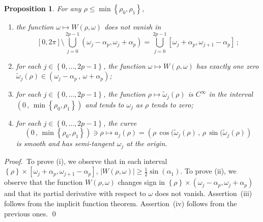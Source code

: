 \documentclass[12pt,a4paper]{amsart}
\theoremstyle{plain} %
\newtheorem{proposition}[theorem]{Proposition}
\theoremstyle{definition}
\numberwithin{equation}{section}
\numberwithin{figure}{section}
\numberwithin{table}{section}
\newcommand{\pf}{\emph{Proof.~}}
\newcommand{\sm}{\!\setminus\!}
\newcommand{\set}[1]{\left\lbrace #1 \right\rbrace}
\newcommand{\omegat}{\widetilde{\omega}}
\begin{document}
\begin{proposition}\label{P-lsc-2}
For any $\rho \le \min\set{\rho_0,\rho_1}$,
\begin{enumerate}
  \item[(i)] the function $\omega \mapsto W(\rho,\omega)$ does not vanish in $$
      [0,2\pi] \sm \bigcup_{j=0}^{2p-1}\left( \omega_j-\alpha_p,\omega_j+\alpha_p\right) = \bigcup_{j=0}^{2p-1}\left[ \omega_j+\alpha_p,\omega_{j+1}-\alpha_p\right]\,;
$$
  \item[(ii)]for each $j \in \set{0,\ldots,2p-1}$, the function $\omega \mapsto W(\rho,\omega)$ has exactly one zero
  $\omegat_j(\rho) \in \left( \omega_j - \alpha_p \,,\, \omega+\alpha_p \right)$;
  \item[(iii)] for each $j \in \set{0,\ldots,2p-1}$, the function $\rho \mapsto \omegat_j(\rho)$ is $C^{\infty}$ in the interval $\left( 0 \,,\, \min\set{\rho_0,\rho_1}\right)$ and tends to $\omega_j$ as $\rho$ tends to zero;
  \item[(iv)] for each $j \in \set{0,\ldots,2p-1}$, the curve
  $$
  \left( 0 \,,\, \min\set{\rho_0,\rho_1}\right) \ni \rho \mapsto a_j(\rho) = \left( \rho \, \cos(\omegat_j(\rho) \,,\, \rho \, \sin(\omegat_j(\rho)  \right)
  $$
  is smooth and has semi-tangent $\omega_j$ at the origin.
\end{enumerate}
\end{proposition}%

\pf To prove (i), we observe that in each interval $\set{\rho} \times \left[ \omega_j+\alpha_p,\omega_{j+1}-\alpha_p\right]$, $|W(\rho,\omega)| \ge \frac 12 \sin(\alpha_1)$. To prove (ii), we observe that the function $W(\rho,\omega)$ changes sign in $\set{\rho}\times \left( \omega_j-\alpha_p,\omega_j+\alpha_p\right)$ and that its partial derivative with respect to $\omega$ does not vanish.  Assertion~(iii) follows from the implicit function theorem. Assertion~(iv) follows from the previous ones. \hfill \qed
\end{document}
